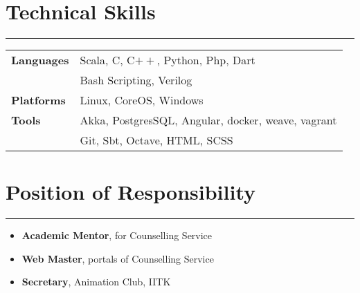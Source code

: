 \documentclass[a4paper]{article}
\begin{document}
 \section*{Technical Skills}
 \hrule
 \vspace{3mm}
  \begin{tabular}{@{}m{4.0cm}m{13cm}@{}}
   \textbf{\textrm{Languages}} & 
Scala, C, C$++$, Python, Php, Dart\\
& Bash Scripting, Verilog\\ 
  \textbf{\textrm{Platforms}} &
  Linux, CoreOS, Windows\\
  
  \textbf{\textrm{Tools}} &
  Akka, PostgresSQL, Angular, docker, weave, vagrant\\
  & Git, Sbt, Octave, HTML, SCSS\\
  \end{tabular}

 \section*{Position of Responsibility}
 \hrule
 \vspace{3mm}
 \begin{itemize}
    \itemsep-0.2em
    \item \textbf{Academic Mentor}, for Counselling Service 
    \item \textbf{Web Master}, portals of Counselling Service
    \item \textbf{Secretary}, Animation Club, IITK    
 \end{itemize}
\end{document}
